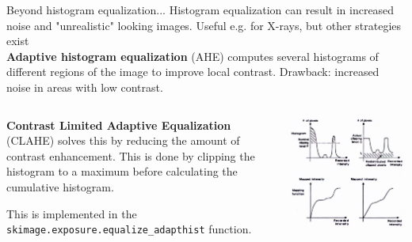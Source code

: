 \documentclass[9pt, aspectratio=169]{beamer}
\begin{document}
\begin{frame}
    {Beyond histogram equalization...}
    Histogram equalization can result in increased noise and "unrealistic" looking images. Useful e.g. for X-rays, but other strategies exist
    \pause
    \\
    \textbf{Adaptive histogram equalization} (AHE) computes several histograms of different regions of the image to improve local
    contrast. Drawback: increased noise in areas with low contrast.

    \pause
    \centering
    \begin{columns}
        \begin{column}{.6\textwidth}
            \textbf{Contrast Limited Adaptive Equalization} (CLAHE) solves this by reducing the amount of contrast enhancement. This is done by clipping the histogram to a maximum before calculating the cumulative histogram.

            This is implemented in the \texttt{skimage.exposure.equalize\_adapthist} function.
        \end{column}
        \begin{column}{.35\textwidth}
            \includegraphics[width=\textwidth]{Pizer1986.png}
        \end{column}
    \end{columns}
\end{frame}
\end{document}
